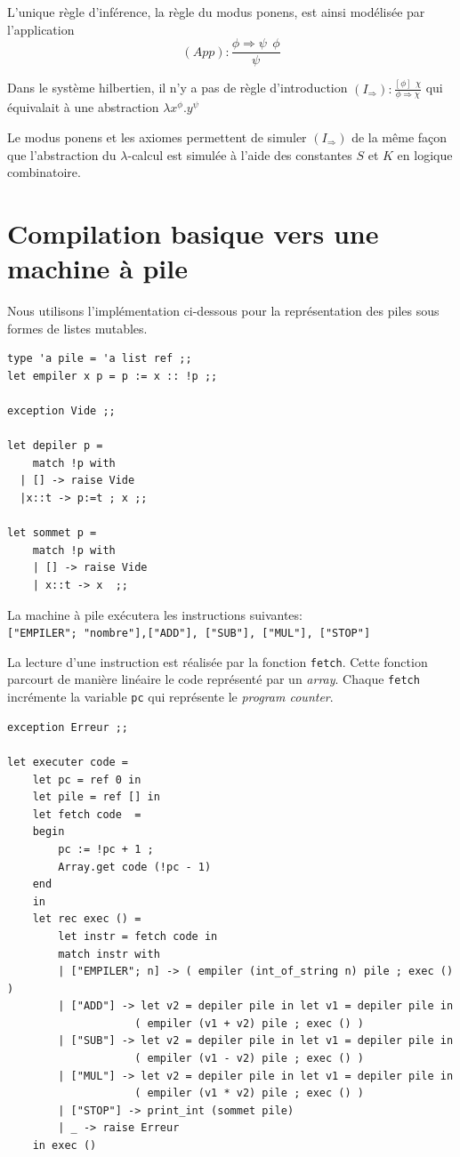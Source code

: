 L'unique règle d'inférence, la règle du modus ponens, est ainsi modélisée par l'application
$$ (App) : \frac{\phi \Rightarrow \psi \ \ \phi}{\psi} $$

Dans le système hilbertien, il n'y a pas de règle d'introduction 
$(I_\Rightarrow) : \frac{[\phi]\ \ \chi}{\phi \Rightarrow \chi}$ qui équivalait à une abstraction 
$\lambda x^\phi.y^\psi $

Le modus ponens et les axiomes permettent de simuler $(I_\Rightarrow )$ de la même façon que 
l'abstraction du $\lambda$-calcul est simulée à l'aide des constantes $S$ et $K$ en logique combinatoire.


\section{Compilation basique vers une machine à pile}
Nous utilisons l'implémentation ci-dessous pour la représentation des piles sous
formes de listes mutables.
\begin{verbatim}
type 'a pile = 'a list ref ;;
let empiler x p = p := x :: !p ;;

exception Vide ;;

let depiler p =  
	match !p with
  | [] -> raise Vide
  |x::t -> p:=t ; x ;;

let sommet p =
	match !p with
	| [] -> raise Vide
	| x::t -> x  ;;
\end{verbatim}

La machine à pile exécutera les instructions suivantes:\\
\texttt{["EMPILER"; "nombre"],["ADD"], ["SUB"], ["MUL"], ["STOP"]}

La lecture d'une instruction est réalisée par la fonction \texttt{fetch}. Cette
fonction parcourt de manière linéaire le code représenté par un \textit{array}.
Chaque \texttt{fetch} incrémente la variable \texttt{pc} qui représente le
\textit{program counter}.

\begin{verbatim}
exception Erreur ;;
	
let executer code =
	let pc = ref 0 in
	let pile = ref [] in
	let fetch code  =
	begin
		pc := !pc + 1 ; 
		Array.get code (!pc - 1) 
	end 
	in
	let rec exec () =
		let instr = fetch code in
		match instr with
		| ["EMPILER"; n] -> ( empiler (int_of_string n) pile ; exec () )
		| ["ADD"] -> let v2 = depiler pile in let v1 = depiler pile in 
		            ( empiler (v1 + v2) pile ; exec () )
		| ["SUB"] -> let v2 = depiler pile in let v1 = depiler pile in
		            ( empiler (v1 - v2) pile ; exec () )
		| ["MUL"] -> let v2 = depiler pile in let v1 = depiler pile in
		            ( empiler (v1 * v2) pile ; exec () )
		| ["STOP"] -> print_int (sommet pile)
		| _ -> raise Erreur
	in exec ()
\end{verbatim}

